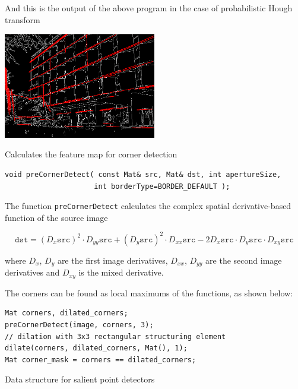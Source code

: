 And this is the output of the above program in the case of probabilistic Hough transform

\includegraphics[width=0.5\textwidth]{pics/houghp.png}

\label{perCornerDetect}
Calculates the feature map for corner detection

\begin{lstlisting}
void preCornerDetect( const Mat& src, Mat& dst, int apertureSize,
                     int borderType=BORDER_DEFAULT );
\end{lstlisting}
\begin{description}
\end{description}

The function \texttt{preCornerDetect} calculates the complex spatial derivative-based function of the source image

\[
\texttt{dst} = (D_x \texttt{src})^2 \cdot D_{yy} \texttt{src} + (D_y \texttt{src})^2 \cdot D_{xx} \texttt{src} - 2 D_x \texttt{src} \cdot D_y \texttt{src} \cdot D_{xy} \texttt{src}
\]

where $D_x$, $D_y$ are the first image derivatives, $D_{xx}$, $D_{yy}$ are the second image derivatives and $D_{xy}$ is the mixed derivative.

The corners can be found as local maximums of the functions, as shown below:

\begin{lstlisting}
Mat corners, dilated_corners;
preCornerDetect(image, corners, 3);
// dilation with 3x3 rectangular structuring element
dilate(corners, dilated_corners, Mat(), 1);
Mat corner_mask = corners == dilated_corners;
\end{lstlisting}


\label{KeyPoint}
Data structure for salient point detectors

